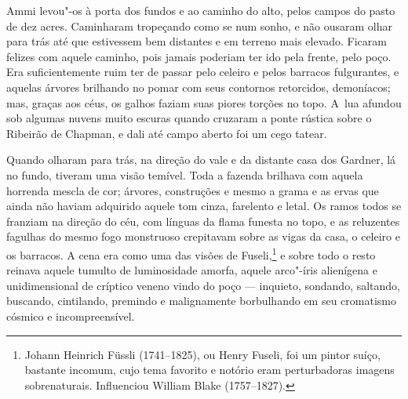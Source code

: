 Ammi levou"-os à porta dos fundos e ao caminho do alto, pelos campos do
pasto de dez acres. Caminharam tropeçando como se num sonho, e não
ousaram olhar para trás até que estivessem bem distantes e em terreno
mais elevado. Ficaram felizes com aquele caminho, pois jamais poderiam
ter ido pela frente, pelo poço. Era suficientemente ruim ter de passar
pelo celeiro e pelos barracos fulgurantes, e aquelas árvores brilhando
no pomar com seus contornos retorcidos, demoníacos; mas, graças aos
céus, os galhos faziam suas piores torções no topo. A~lua afundou sob
algumas nuvens muito escuras quando cruzaram a ponte rústica sobre o
Ribeirão de Chapman, e dali até campo aberto foi um cego tatear.

Quando olharam para trás, na direção do vale e da distante casa dos
Gardner, lá no fundo, tiveram uma visão temível. Toda a fazenda brilhava
com aquela horrenda mescla de cor; árvores, construções e mesmo a grama
e as ervas que ainda não haviam adquirido aquele tom cinza, farelento e
letal. Os ramos todos se franziam na direção do céu, com línguas da
flama funesta no topo, e as reluzentes fagulhas do mesmo fogo monstruoso
crepitavam sobre as vigas da casa, o celeiro e os barracos. A cena era
como uma das visões de Fuseli,\footnote{Johann Heinrich Füssli
  (1741--1825), ou Henry Fuseli, foi um pintor suíço, bastante incomum,
  cujo tema favorito e notório eram perturbadoras imagens sobrenaturais.
  Influenciou William Blake (1757--1827).} e sobre todo o resto reinava
aquele tumulto de luminosidade amorfa, aquele arco"-íris alienígena e
unidimensional de críptico veneno vindo do poço --- inquieto, sondando,
saltando, buscando, cintilando, premindo e malignamente borbulhando em
seu cromatismo cósmico e incompreensível.

